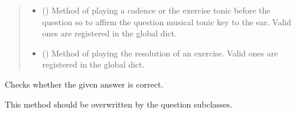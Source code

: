 \documentclass[letterpaper,10pt,english]{sphinxmanual}
\begin{document}
\begin{fulllineitems}
\begin{fulllineitems}
\begin{quote}
\begin{description}
\begin{itemize}
\item {} 
 () \textendash{} Method of playing a cadence or the
exercise tonic before the question so to affirm the question
musical tonic key to the ear. Valid ones are registered in the
 global dict.

\item {} 
 () \textendash{} Method of playing the resolution of an
exercise. Valid ones are registered in the
 global dict.

\end{itemize}

\end{description}\end{quote}

\end{fulllineitems}


\begin{fulllineitems}
\label{\detokenize{index:birdears.questions.harmonicinterval.HarmonicIntervalQuestion.check_question}}
Checks whether the given answer is correct.

\end{fulllineitems}


\begin{fulllineitems}
\label{\detokenize{index:birdears.questions.harmonicinterval.HarmonicIntervalQuestion.make_pre_question}}
\end{fulllineitems}


\begin{fulllineitems}
\label{\detokenize{index:birdears.questions.harmonicinterval.HarmonicIntervalQuestion.make_question}}
This method should be overwritten by the question subclasses.


\end{fulllineitems}
\end{fulllineitems}
\end{document}
